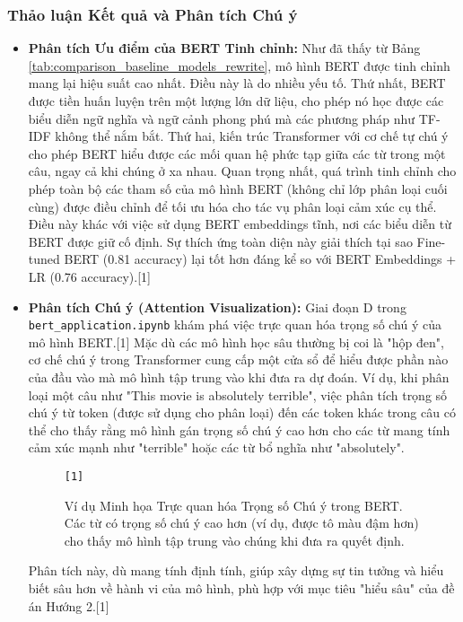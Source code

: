 \subsubsection{Thảo luận Kết quả và Phân tích Chú ý}
\label{sssec:thao_luan_ket_qua_phan_tich_chu_y_rewrite}

\begin{itemize}
    \item \textbf{Phân tích Ưu điểm của BERT Tinh chỉnh:}
    Như đã thấy từ Bảng \ref{tab:comparison_baseline_models_rewrite}, mô hình BERT được tinh chỉnh mang lại hiệu suất cao nhất. Điều này là do nhiều yếu tố. Thứ nhất, BERT được tiền huấn luyện trên một lượng lớn dữ liệu, cho phép nó học được các biểu diễn ngữ nghĩa và ngữ cảnh phong phú mà các phương pháp như TF-IDF không thể nắm bắt. Thứ hai, kiến trúc Transformer với cơ chế tự chú ý cho phép BERT hiểu được các mối quan hệ phức tạp giữa các từ trong một câu, ngay cả khi chúng ở xa nhau. Quan trọng nhất, quá trình tinh chỉnh cho phép toàn bộ các tham số của mô hình BERT (không chỉ lớp phân loại cuối cùng) được điều chỉnh để tối ưu hóa cho tác vụ phân loại cảm xúc cụ thể. Điều này khác với việc sử dụng BERT embeddings tĩnh, nơi các biểu diễn từ BERT được giữ cố định. Sự thích ứng toàn diện này giải thích tại sao Fine-tuned BERT (0.81 accuracy) lại tốt hơn đáng kể so với BERT Embeddings + LR (0.76 accuracy).[1]

    \item \textbf{Phân tích Chú ý (Attention Visualization):}
    Giai đoạn D trong \texttt{bert\_application.ipynb} khám phá việc trực quan hóa trọng số chú ý của mô hình BERT.[1] Mặc dù các mô hình học sâu thường bị coi là "hộp đen", cơ chế chú ý trong Transformer cung cấp một cửa sổ để hiểu được phần nào của đầu vào mà mô hình tập trung vào khi đưa ra dự đoán. Ví dụ, khi phân loại một câu như "This movie is absolutely terrible", việc phân tích trọng số chú ý từ token \texttt{} (được sử dụng cho phân loại) đến các token khác trong câu có thể cho thấy rằng mô hình gán trọng số chú ý cao hơn cho các từ mang tính cảm xúc mạnh như "terrible" hoặc các từ bổ nghĩa như "absolutely".
    \begin{figure}[H]
        \centering
        \texttt{[1]}
        \caption{Ví dụ Minh họa Trực quan hóa Trọng số Chú ý trong BERT. Các từ có trọng số chú ý cao hơn (ví dụ, được tô màu đậm hơn) cho thấy mô hình tập trung vào chúng khi đưa ra quyết định.}
        \label{fig:attention_visualization_example_rewrite}
    \end{figure}
    Phân tích này, dù mang tính định tính, giúp xây dựng sự tin tưởng và hiểu biết sâu hơn về hành vi của mô hình, phù hợp với mục tiêu "hiểu sâu" của đề án Hướng 2.[1]


\end{itemize}
